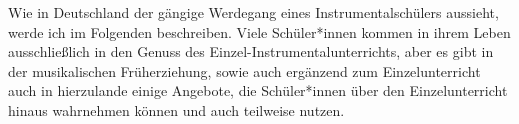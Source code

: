 
Wie in Deutschland der gängige Werdegang eines Instrumentalschülers aussieht,
werde ich im Folgenden beschreiben. Viele Schüler*innen kommen in ihrem Leben
ausschließlich in den Genuss des Einzel-Instrumentalunterrichts, aber es gibt in
der musikalischen Früherziehung, sowie auch ergänzend zum Einzelunterricht auch
in hierzulande einige Angebote, die Schüler*innen über den Einzelunterricht
hinaus wahrnehmen können und auch teilweise nutzen.





